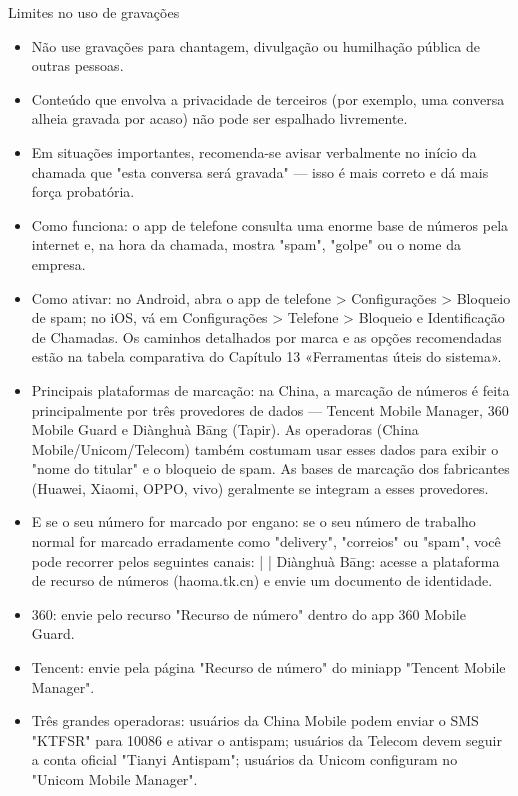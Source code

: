 \begin{tcbwarn}{Limites no uso de gravações}
\begin{itemize}
  \item Não use gravações para chantagem, divulgação ou humilhação pública de outras pessoas.
  \item Conteúdo que envolva a privacidade de terceiros (por exemplo, uma conversa alheia gravada por acaso) não pode ser espalhado livremente.
  \item Em situações importantes, recomenda-se avisar verbalmente no início da chamada que "esta conversa será gravada" — isso é mais correto e dá mais força probatória.
\end{itemize}

\end{tcbwarn}


\begin{itemize}
  \item Como funciona: o app de telefone consulta uma enorme base de números pela internet e, na hora da chamada, mostra "spam", "golpe" ou o nome da empresa.
  \item Como ativar: no Android, abra o app de telefone > Configurações > Bloqueio de spam; no iOS, vá em Configurações > Telefone > Bloqueio e Identificação de Chamadas. Os caminhos detalhados por marca e as opções recomendadas estão na tabela comparativa do Capítulo 13 «Ferramentas úteis do sistema».
  \item Principais plataformas de marcação: na China, a marcação de números é feita principalmente por três provedores de dados — Tencent Mobile Manager, 360 Mobile Guard e Diànghuà Bāng (Tapir). As operadoras (China Mobile/Unicom/Telecom) também costumam usar esses dados para exibir o "nome do titular" e o bloqueio de spam. As bases de marcação dos fabricantes (Huawei, Xiaomi, OPPO, vivo) geralmente se integram a esses provedores.
  \item E se o seu número for marcado por engano: se o seu número de trabalho normal for marcado erradamente como "delivery", "correios" ou "spam", você pode recorrer pelos seguintes canais: | | Diànghuà Bāng: acesse a plataforma de recurso de números (haoma.tk.cn) e envie um documento de identidade.
  \item 360: envie pelo recurso "Recurso de número" dentro do app 360 Mobile Guard.
  \item Tencent: envie pela página "Recurso de número" do miniapp "Tencent Mobile Manager".
  \item Três grandes operadoras: usuários da China Mobile podem enviar o SMS "KTFSR" para 10086 e ativar o antispam; usuários da Telecom devem seguir a conta oficial "Tianyi Antispam"; usuários da Unicom configuram no "Unicom Mobile Manager".
\end{itemize}

